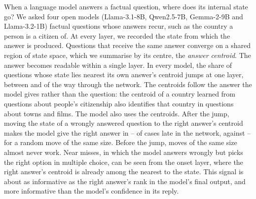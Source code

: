 When a language model answers a factual question, where does its internal state go? We asked four open models (Llama-3.1-8B, Qwen2.5-7B, Gemma-2-9B and Llama-3.2-1B) \NFacts{} factual questions whose answers recur, such as the country a person is a citizen of. At every layer, we recorded the state from which the answer is produced. Questions that receive the same answer converge on a shared region of state space, which we summarise by its centre, the \emph{answer centroid}. The answer becomes readable within a single layer. In every model, the share of questions whose state lies nearest its own answer's centroid jumps at one layer, between \OnsetMin{} and \OnsetMax{} of the way through the network. The centroids follow the answer the model gives rather than the question: the centroid of a country learned from questions about people's citizenship also identifies that country in questions about towns and films. The model also uses the centroids. After the jump, moving the state of a wrongly answered question to the right answer's centroid makes the model give the right answer in \PushGoldMin{}--\PushGoldMax{} of cases late in the network, against \PushRandomMin{}--\PushRandomMax{} for a random move of the same size. Before the jump, moves of the same size almost never work. Near misses, in which the model answers wrongly but picks the right option in multiple choice, can be seen from the onset layer, where the right answer's centroid is already among the nearest to the state. This signal is about as informative as the right answer's rank in the model's final output, and more informative than the model's confidence in its reply.
